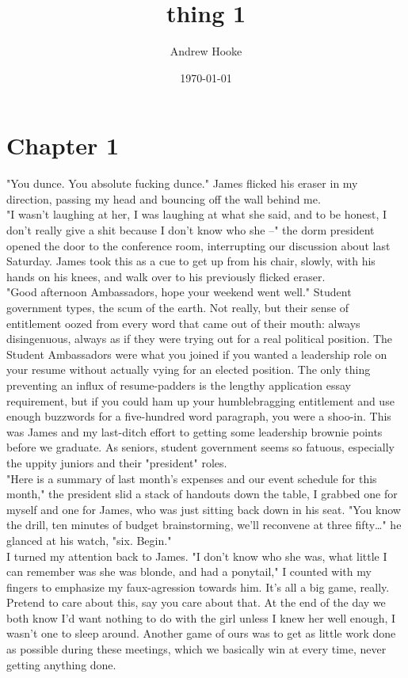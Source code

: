 \documentclass[11pt]{article}
\author{Andrew Hooke}
\date{\today}
\title{thing 1}
\begin{document}
\maketitle
\tableofcontents

\section*{Chapter 1}
\label{sec:org113f903}
"You dunce. You absolute fucking dunce." James flicked his eraser in my direction, passing my head and bouncing off the wall behind me. \\
"I wasn't laughing at her, I was laughing at what she said, and to be honest, I don't really give a shit because I don't know who she --" the dorm president opened the door to the conference room, interrupting our discussion about last Saturday. James took this as a cue to get up from his chair, slowly, with his hands on his knees, and walk over to his previously flicked eraser. \\
"Good afternoon Ambassadors, hope your weekend went well." Student government types, the scum of the earth. Not really, but their sense of entitlement oozed from every word that came out of their mouth: always disingenuous, always as if they were trying out for a real political position. The Student Ambassadors were what you joined if you wanted a leadership role on your resume without actually vying for an elected position. The only thing preventing an influx of resume-padders is the lengthy application essay requirement, but if you could ham up your humblebragging entitlement and use enough buzzwords for a five-hundred word paragraph, you were a shoo-in. This was James and my last-ditch effort to getting some leadership brownie points before we graduate. As seniors, student government seems so fatuous, especially the uppity juniors and their "president" roles. \\
"Here is a summary of last month's expenses and our event schedule for this month," the president slid a stack of handouts down the table, I grabbed one for myself and one for James, who was just sitting back down in his seat. "You know the drill, ten minutes of budget brainstorming, we'll reconvene at three fifty\ldots{}" he glanced at his watch, "six. Begin." \\
I turned my attention back to James. "I don't know who she was, what little I can remember was she was blonde, and had a ponytail," I counted with my fingers to emphasize my faux-agression towards him. It's all a big game, really. Pretend to care about this, say you care about that. At the end of the day we both know I'd want nothing to do with the girl unless I knew her well enough, I wasn't one to sleep around. Another game of ours was to get as little work done as possible during these meetings, which we basically win at every time, never getting anything done. \\
\end{document}
